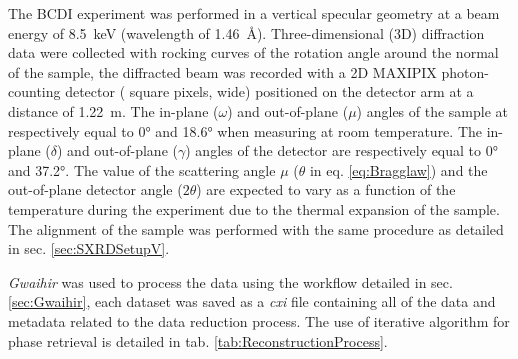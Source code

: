The BCDI experiment was performed in a vertical specular geometry at a beam energy of \qty{8.5}{\keV} (wavelength of \qty{1.46}{\angstrom}).
Three-dimensional (3D) diffraction data were collected with rocking curves of the rotation angle around the normal of the sample, the diffracted beam was recorded with a 2D MAXIPIX photon-counting detector ( square pixels,  wide) positioned on the detector arm at a distance of \qty{1.22}{\meter}.
The in-plane ($\omega$) and out-of-plane ($\mu$) angles of the sample at respectively equal to \ang{0} and \ang{18.6} when measuring at room temperature.
The in-plane ($\delta$) and out-of-plane ($\gamma$) angles of the detector are respectively equal to \ang{0} and \ang{37.2}.
The value of the scattering angle $\mu$ ($\theta$ in eq. \ref{eq:Bragglaw}) and the out-of-plane detector angle ($2\theta$) are expected to vary as a function of the temperature during the experiment due to the thermal expansion of the sample.
The alignment of the sample was performed with the same procedure as detailed in sec. \ref{sec:SXRDSetupV}.

\textit{Gwaihir} was used to process the data using the workflow detailed in sec. \ref{sec:Gwaihir}, each dataset was saved as a \textit{cxi} file containing all of the data and metadata related to the data reduction process.
The use of iterative algorithm for phase retrieval is detailed in tab. \ref{tab:ReconstructionProcess}.

\begin{table}[!htb]
\centering
{}
\caption{Example of algorithm chain used in BCDI for the phase retrieval.}
\label{tab:ReconstructionProcess}
\end{table}

